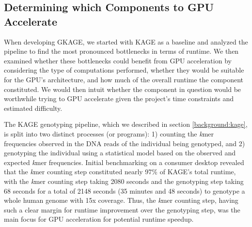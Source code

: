 \subsection{Determining which Components to GPU Accelerate} \label{methods:determining_which_components_to_gpu_accelerate}
When developing GKAGE, we started with KAGE as a baseline and analyzed the pipeline to find the most pronounced bottlenecks in terms of runtime.
We then examined whether these bottlenecks could benefit from GPU acceleration by considering the type of computations performed, whether they would be suitable for the GPU's architecture, and how much of the overall runtime the component constituted. 
We would then intuit whether the component in question would be worthwhile trying to GPU accelerate given the project's time constraints and estimated difficulty.

The KAGE genotyping pipeline, which we described in section \ref{background:kage}, is split into two distinct processes (or programs): 1) counting the \textit{k}mer frequencies observed in the DNA reads of the individual being genotyped, and 2) genotyping the individual using a statistical model based on the observed and expected \textit{k}mer frequencies.
Initial benchmarking on a consumer desktop revealed that the \textit{k}mer counting step constituted nearly 97\% of KAGE's total runtime, with the \textit{k}mer counting step taking 2080 seconds and the genotyping step taking 68 seconds for a total of 2148 seconds (35 minutes and 48 seconds) to genotype a whole human genome with 15x coverage.
Thus, the \textit{k}mer counting step, having such a clear margin for runtime improvement over the genotyping step, was the main focus for GPU acceleration for potential runtime speedup.
